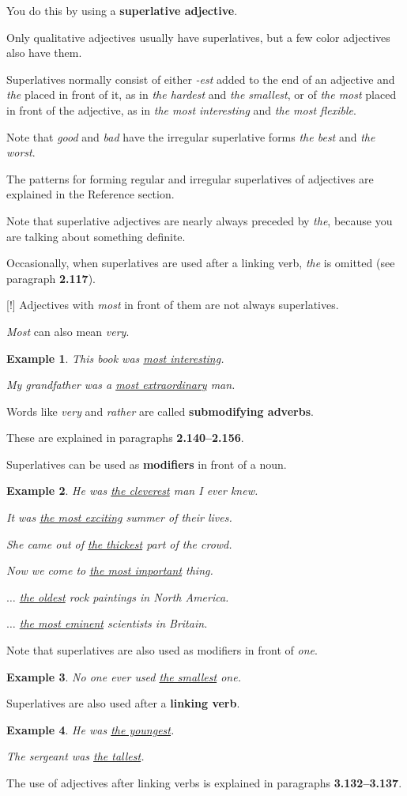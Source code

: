 \documentclass[oneside]{book}
\numberwithin{equation}{section}
\newtheorem{example}{Example}[section]
\begin{document}
You do this by using a \textbf{superlative adjective}.

Only qualitative adjectives usually have superlatives, but a few color adjectives also have them.

Superlatives normally consist of either \textit{-est} added to the end of an adjective and \textit{the} placed in front of it, as in \textit{the hardest} and \textit{the smallest}, or of \textit{the most} placed in front of the adjective, as in \textit{the most interesting} and \textit{the most flexible}.

%
Note that \textit{good} and \textit{bad} have the irregular superlative forms \textit{the best} and \textit{the worst}.

%
The patterns for forming regular and irregular superlatives of adjectives are explained in the Reference section.

%
Note that superlative adjectives are nearly always preceded by \textit{the}, because you are talking about something definite.

Occasionally, when superlatives are used after a linking verb, \textit{the} is omitted (see paragraph \textbf{2.117}).

%
\noindent{} [!] Adjectives with \textit{most} in front of them are not always superlatives.

\textit{Most} can also mean \textit{very}.
\begin{example}
    This book was \underline{most interesting}.
    
    My grandfather was a \underline{most extraordinary} man.
\end{example}
Words like \textit{very} and \textit{rather} are called \textbf{submodifying adverbs}.

These are explained in paragraphs \textbf{2.140--2.156}.

%
\noindent{} Superlatives can be used as \textbf{modifiers} in front of a noun.
\begin{example}
    He was \underline{the cleverest} man I ever knew.
    
    It was \underline{the most exciting} summer of their lives.
    
    She came out of \underline{the thickest} part of the crowd.
    
    Now we come to \underline{the most important} thing.
    
    $\ldots$ \underline{the oldest} rock paintings in North America.
    
    $\ldots$ \underline{the most eminent} scientists in Britain.
\end{example}
Note that superlatives are also used as modifiers in front of \textit{one}.
\begin{example}
    No one ever used \underline{the smallest} one.
\end{example}
%
\noindent{} Superlatives are also used after a \textbf{linking verb}.
\begin{example}
    He was \underline{the youngest}.
    
    The sergeant was \underline{the tallest}.
\end{example}
The use of adjectives after linking verbs is explained in paragraphs \textbf{3.132--3.137}.
\end{document}
